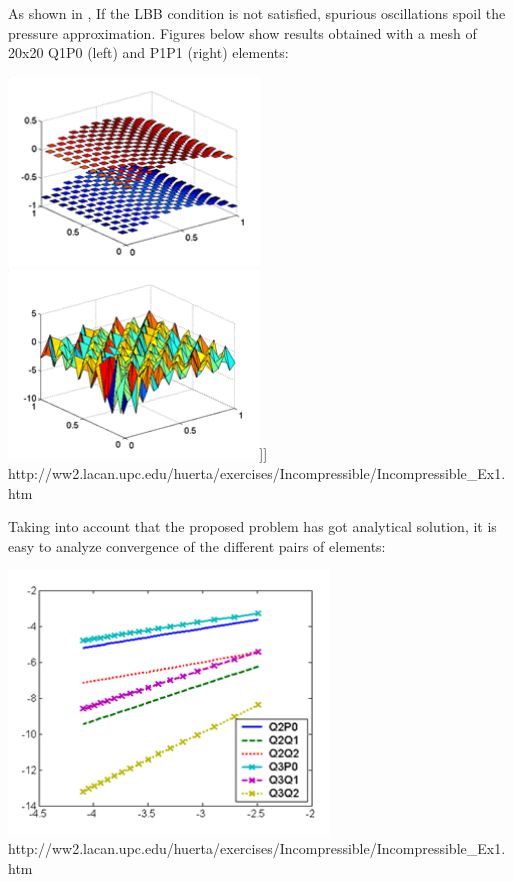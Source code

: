 As shown in \cite{dohu03}, If the LBB condition is not satisfied, spurious oscillations spoil the pressure approximation. 
Figures below show results obtained with a mesh of 20x20 Q1P0 (left) and P1P1 (right) elements:
\begin{center}
\includegraphics[height=5cm]{images/mms/Ex1_Q1P0_pres.png}
\includegraphics[height=5cm]{images/mms/Ex1_P1P1_pres.png}]]
{\small http://ww2.lacan.upc.edu/huerta/exercises/Incompressible/Incompressible\_Ex1.htm}
\end{center}

Taking into account that the proposed problem has got analytical solution, it is easy to analyze convergence of the different pairs of elements:
\begin{center}
\includegraphics[height=7cm]{images/mms/Ex1_conv_qua.png}\\
{\small http://ww2.lacan.upc.edu/huerta/exercises/Incompressible/Incompressible\_Ex1.htm}
\end{center}

